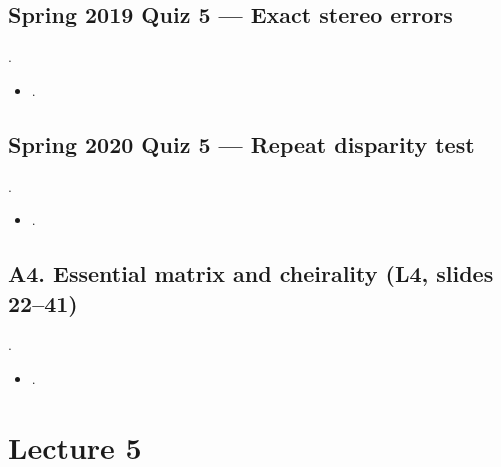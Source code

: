\documentclass[letterpaper,11pt,english,openany,oneside]{jupyterBook}
\begin{document}
\subsection{Spring 2019 Quiz 5 — Exact stereo errors}
\label{\detokenize{reference/quiz-index:spring-2019-quiz-5-exact-stereo-errors}}
\sphinxAtStartPar
{} .
\begin{itemize}
\item {}
\sphinxAtStartPar
{\hyperref[\detokenize{lectures/lecture04/quiz-workbook:quiz-5-q1}]{}}.

\end{itemize}


\subsection{Spring 2020 Quiz 5 — Repeat disparity test}
\label{\detokenize{reference/quiz-index:spring-2020-quiz-5-repeat-disparity-test}}
\sphinxAtStartPar
{} .
\begin{itemize}
\item {}
\sphinxAtStartPar
{\hyperref[\detokenize{lectures/lecture04/quiz-workbook:quiz-6-q1}]{}}.

\end{itemize}


\subsection{A4. Essential matrix and cheirality (L4, slides 22–41)}
\label{\detokenize{reference/quiz-index:a4-essential-matrix-and-cheirality-l4-slides-2241}}
\sphinxAtStartPar
{} . 
\begin{itemize}
\item {}
\sphinxAtStartPar
{\hyperref[\detokenize{lectures/lecture04/quiz-workbook:quiz-a4-q1}]{}}.

\end{itemize}


\section{Lecture 5}
\label{\detokenize{reference/quiz-index:lecture-5}}
\sphinxAtStartPar
{}
\end{document}
